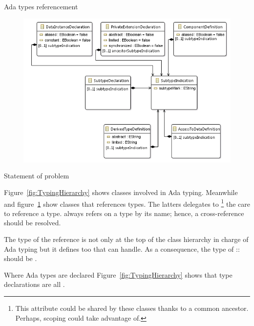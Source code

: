 \documentclass[a4paper]{prjdoc}
\begin{document}
\begin{asection}{Ada types referencement}
     \begin{figure}
     \includegraphics[scale=0.90]{"../../model/References to types"}
     \label{fig:ReferencesToTypes}
     \end{figure}

     \begin{asection}{Statement of problem}
      
     Figure~\ref{fig:TypingHierarchy} shows classes involved in Ada typing.
     Meanwhile and figure~\ref{fig:ReferencesToTypes} show classes that references types.
     The latters delegates to 
     \footnote{This attribute could be shared by these classes thanks to a common ancestor. 
     Perhaps, scoping could take advantage of.} the care to reference a type.
      always refers on a type by its name; 
     hence, a cross-reference should be resolved. 
       
     \end{asection} %

     \begin{asection}{The type of the reference}
      is not only at the top of the class hierarchy in charge of Ada typing but
     it defines  too that 
      can handle.
     As a consequence, the type of :: should be .            
     \end{asection} %
             
     \begin{asection}{Where Ada types are declared}
     Figure~\ref{fig:TypingHierarchy} shows that type declarations 
      are all .
 

\end{asection}
\end{asection}
\end{document}
